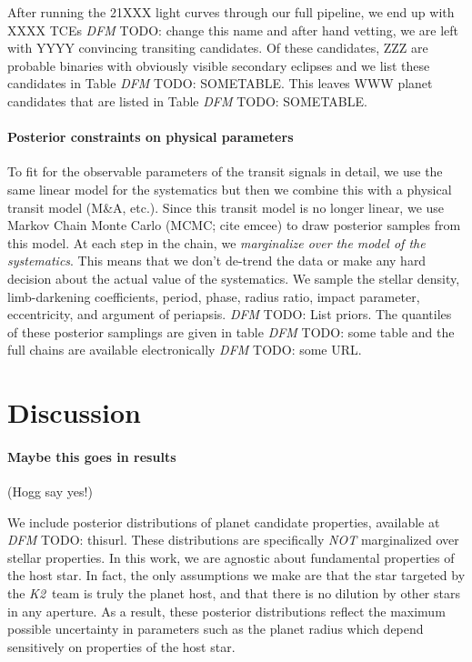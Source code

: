 \documentclass[12pt,preprint]{aastex}
\newcommand{\project}[1]{\textsl{#1}} %
\newcommand{\KT}{\project{K2}}
\newcommand{\todo}[3]{{\color{#2} \emph{#1} TODO: #3}}
\newcommand{\dfmtodo}[1]{\todo{DFM}{red}{#1}}
\begin{document}
After running the 21XXX light curves through our full pipeline, we end up
with XXXX TCEs \dfmtodo{change this name} and after hand vetting, we are left
with YYYY convincing transiting candidates.
Of these candidates, ZZZ are probable binaries with obviously visible
secondary eclipses and we list these candidates in Table \dfmtodo{SOMETABLE}.
This leaves WWW planet candidates that are listed in Table
\dfmtodo{SOMETABLE}.

\paragraph{Posterior constraints on physical parameters}

To fit for the observable parameters of the transit signals in detail, we use
the same linear model for the systematics but then we combine this with a
physical transit model (M\&A, etc.).
Since this transit model is no longer linear, we use Markov Chain Monte Carlo
(MCMC; cite emcee) to draw posterior samples from this model.
At each step in the chain, we \emph{marginalize over the model of the
systematics}.
This means that we don't de-trend the data or make any hard decision about
the actual value of the systematics.
We sample the stellar density, limb-darkening coefficients, period, phase,
radius ratio, impact parameter, eccentricity, and argument of periapsis.
\dfmtodo{List priors.}
The quantiles of these posterior samplings are given in table \dfmtodo{some
table} and the full chains are available electronically \dfmtodo{some URL}.


\section{Discussion}


\paragraph{Maybe this goes in results} (Hogg say yes!)

We include posterior distributions of planet candidate properties, available at
\dfmtodo{thisurl}.
These distributions are specifically \emph{NOT} marginalized over stellar
properties.
In this work, we are agnostic about fundamental properties of the host star.
In fact, the only assumptions we make are that the star targeted by the \KT\
team is truly the planet host, and that there is no dilution by other stars in
any aperture.
As a result, these posterior distributions reflect the maximum possible
uncertainty in parameters such as the planet radius which depend sensitively
on properties of the host star.
\end{document}
